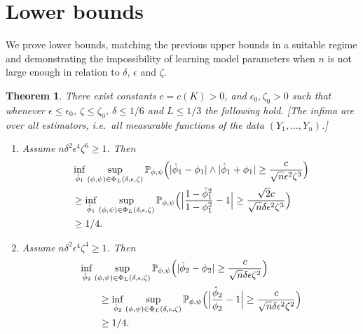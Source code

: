 \documentclass[journal]{IEEEtran}
\newtheorem{theorem}{Theorem}
\newcommand{\1}{\boldsymbol{1}}
\newcommand{\PP}{\mathbb{P}}
\DeclarePairedDelimiter{\brackets}{(}{)}
\DeclarePairedDelimiter{\abs}{\lvert}{\rvert}
\begin{document}
	\section{Lower bounds}
	\label{sec:lower-bounds}
	We prove lower bounds, matching the previous upper bounds in a suitable regime and demonstrating the impossibility of learning model parameters when $n$ is not large enough in relation to $\delta$, $\epsilon$ and $\zeta$.
	\label{sec:minimax-lower-bounds}
	\begin{theorem}
		\label{thm:mlb}
		There exist constants $c=c(K) > 0$, and $\epsilon_0,\zeta_0 > 0$ such that whenever $\epsilon\leq \epsilon_0$, $\zeta \leq \zeta_0$, $\delta\leq 1/6$ and $L\leq 1/3$ the following hold. [The infima are over all estimators, i.e.\ all measurable functions of the data $(Y_1,\dots,Y_n)$.]
		\begin{enumerate}
			\item\label{item:mlb:phi1}
			Assume $n\delta^2\epsilon^4\zeta^6\geq 1$. Then
			\begin{align*}
			&\inf_{\hat{\phi}_1}  \sup_{(\phi,\psi)\in\Phi_L(\delta,\epsilon, \zeta)}\PP_{\phi,\psi}\brackets[\Big]{\abs{\hat{\phi}_1 - \phi_1} \wedge\abs{\hat{\phi}_1+\phi_1}
					\geq  \frac{c}{\sqrt{n}\epsilon^2 \zeta^3}}\\
                         &\geq  \inf_{\hat{\phi}_1}  \sup_{(\phi,\psi)\in\Phi_L(\delta,\epsilon, \zeta)} \PP_{\phi,\psi}\brackets[\Big]{\abs[\Big]{\frac{1-\tilde{\phi}_1^2}{1-\phi_1^2}-1}\geq \frac{\sqrt{2}c}{\sqrt{n}\delta\epsilon^2\zeta^3}}\\
                          &\geq 1/4.
			\end{align*}

                        \item\label{item:mlb:phi2} Assume $n\delta^2\epsilon^4\zeta^4\geq 1$. Then
                        \begin{align*}
                          &\inf_{\hat{\phi}_2}  \sup_{(\phi,\psi)\in\Phi_L(\delta,\epsilon, \zeta)}\PP_{\phi,\psi}\brackets[\Big]{\abs{\hat{\phi}_2 - \phi_2}
                            \geq   \frac{c}{ \sqrt{n}\delta \epsilon \zeta^2}}\\
                          &\qquad\geq \inf_{\hat{\phi}_2} \sup_{(\phi,\psi)\in\Phi_L(\delta,\epsilon, \zeta)}\PP_{\phi,\psi}\brackets[\Big]{\abs[\Big]{\frac{\hat{\phi}_2}{\phi_2} - 1}
                            \geq \frac{c}{ \sqrt{n}\delta \epsilon^2 \zeta^2}}\\
                          &\qquad\geq 1/4.
                        \end{align*}


\end{enumerate}
\end{theorem}
\end{document}
